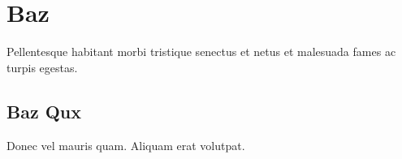 \chapter{Baz}\label{baz}

Pellentesque habitant morbi tristique senectus et netus et malesuada fames ac turpis egestas.

\section{Baz Qux}\label{baz-qux}

Donec vel mauris quam. Aliquam erat volutpat.
